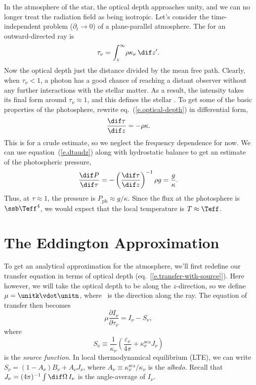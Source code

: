 
In the atmosphere of the star, the optical depth approaches unity, and we can no longer treat the radiation field as being isotropic. Let's consider the time-independent problem ($\partial_{t}\to 0$) of a plane-parallel atmosphere. The  for an outward-directed ray is
\begin{equation}\label{e.optical-depth}
\tau_{\nu} = \int _{z}^{\infty}\!\rho\kappa_{\nu}\,\dif z'.
\end{equation}
Now the optical depth just the distance divided by the mean free path. Clearly, when $\tau_{\nu} < 1$, a photon has a good chance of reaching a distant observer without any further interactions with the stellar matter.  As a result, the intensity takes its final form around $\tau_{\nu} \approx 1$, and this defines the stellar . To get some of the basic properties of the photosphere, rewrite eq.~(\ref{e.optical-depth}) in differential form,
\begin{equation}\label{e.dtaudz}
\frac{\dif\tau}{\dif z} = -\rho\kappa.
\end{equation}
This is for a crude estimate, so we neglect the frequency dependence for now.  We can use equation~(\ref{e.dtaudz}) along with hydrostatic balance to get an estimate of the photospheric pressure,
\begin{equation}\label{e.photo-pressure}
\frac{\dif P}{\dif \tau} = -\left(\frac{\dif \tau}{\dif z}\right)^{-1}\rho g = \frac{g}{\kappa}.
\end{equation}
Thus, at $\tau \approx 1$, the pressure is $P_{\mathrm{ph}}\approx g/\kappa$. Since the flux at the photosphere is $\ssb \Teff^{4}$, we would expect that the local temperature is $T\approx \Teff$.

\section{The Eddington Approximation}

To get an analytical approximation for the atmosphere, we'll first redefine our transfer equation in terms of optical depth (eq.~[\ref{e.transfer-with-source}]). Here however, we will take the optical depth to be along the $z$-direction, so we define $\mu = \unitk\vdot\unitn$, where \unitn\ is the direction along the ray. The equation of transfer then becomes
\begin{equation}\label{e.planar}
\mu\frac{\partial I_{\nu}}{\partial\tau_{\nu}} = I_{\nu}-S_{\nu},
\end{equation}
where 
\begin{equation}\label{e.source}
S_{\nu} \equiv \frac{1}{\kappa_{\nu}}\left(\frac{\varepsilon_{\nu}}{4\pi} + \kappa_{\nu}^{\mathrm{sca}}J_{\nu}\right)
\end{equation}
is the \emph{source function}. In local thermodynamical equilibrium (LTE), we can write $S_{\nu} = (1-A_{\nu})B_{\nu} + A_{\nu}J_{\nu}$, where $A_{\nu} \equiv \kappa_{\nu}^{\mathrm{sca}}/\kappa_{\nu}$ is the \emph{albedo}.  Recall that $J_{\nu} = (4\pi)^{-1}\int\dif\Omega\,I_{\nu}$ is the angle-average of $I_{\nu}$.

